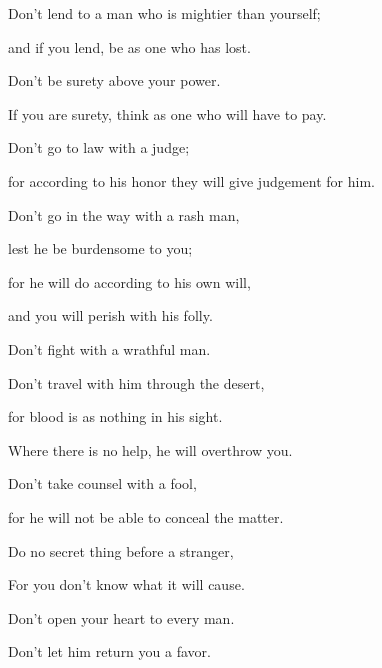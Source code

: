 {\par }{\Q {}Don’t lend to a man who is mightier than yourself;
\par }{\QB and if you lend, be as one who has lost.
\par }{\Q {}Don’t be surety above your power.
\par }{\QB If you are surety, think as one who will have to pay.
\par }{\BB \par }{\Q {}Don’t go to law with a judge;
\par }{\QB for according to his honor they will give judgement for him.
\par }{\Q {}Don’t go in the way with a rash man,
\par }{\QB lest he be burdensome to you;
\par }{\QB for he will do according to his own will,
\par }{\QB and you will perish with his folly.
\par }{\Q {}Don’t fight with a wrathful man.
\par }{\QB Don’t travel with him through the desert,
\par }{\QB for blood is as nothing in his sight.
\par }{\QB Where there is no help, he will overthrow you.
\par }{\Q {}Don’t take counsel with a fool,
\par }{\QB for he will not be able to conceal the matter.
\par }{\Q {}Do no secret thing before a stranger,
\par }{\QB For you don’t know what it will cause.
\par }{\Q {}Don’t open your heart to every man.
\par }{\QB Don’t let him return you a favor.
\par }{\BB \par }
